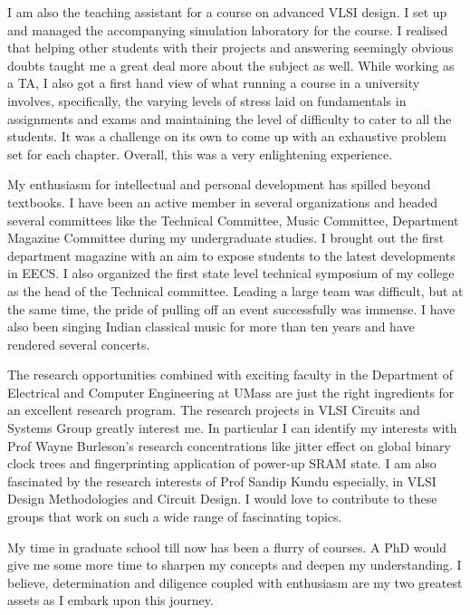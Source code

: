 \documentclass[11pt, letterpaper]{article}
\begin{document}
I am also the teaching assistant for a course on advanced VLSI design. I set up and managed the accompanying simulation laboratory for the course. I realised that helping other students with their projects and answering seemingly obvious doubts taught me a great deal more about the subject as well. While working as a TA, I also got a first hand view of what running a course in a university involves, specifically,  the varying levels of stress laid on fundamentals in assignments and exams and maintaining the level of difficulty to cater to all the students. It was a challenge on its own to come up with an exhaustive problem set for each chapter. Overall, this was a very enlightening experience.

My enthusiasm for intellectual and personal development has spilled beyond textbooks. I have been an active member in several organizations and headed several committees like the Technical Committee, Music Committee, Department Magazine Committee during my undergraduate studies. I brought out the first department magazine with an aim to expose students to the latest developments in EECS. I also organized the first state level technical symposium of my college as the head of the Technical committee. Leading a large team was difficult, but at the same time, the pride of pulling off an event successfully was immense. I have also been singing Indian classical music for more than ten years and have rendered several concerts. 

 The research opportunities combined with exciting faculty in the Department of Electrical and Computer Engineering at UMass are just the right ingredients for an excellent research program. The research projects in VLSI Circuits and Systems Group greatly interest me. In particular I can identify my interests with Prof Wayne Burleson’s research concentrations like jitter effect on global binary clock trees and fingerprinting application of power-up SRAM state. I am also fascinated by the research interests of Prof Sandip Kundu especially, in VLSI Design Methodologies and Circuit Design. I would love to contribute to these groups that work on such a wide range of fascinating topics.

My time in graduate school till now has been a flurry of courses. A PhD would give me some more time to sharpen my concepts and deepen my understanding. I believe, determination and diligence coupled with enthusiasm are my two greatest assets as I embark upon this journey.
\end{document}
